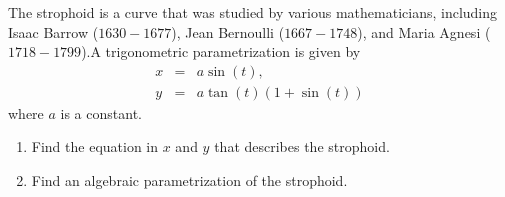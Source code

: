 \begin{exercise}{9}
The strophoid is a curve that was studied by various mathematicians, including Isaac Barrow ($1630-1677$), Jean Bernoulli ($1667-1748$), and Maria Agnesi ($1718-1799$).A trigonometric parametrization is given by
\begin{eqnarray*}
    x & = & a\sin(t),\\
    y & = & a\tan(t)( 1 + \sin(t) )
\end{eqnarray*}
where $a$ is a constant.
    \begin{enumerate}
        \item Find the equation in $x$ and $y$ that describes the strophoid.
        \item Find an algebraic parametrization of the strophoid.
    \end{enumerate}
\end{exercise}
